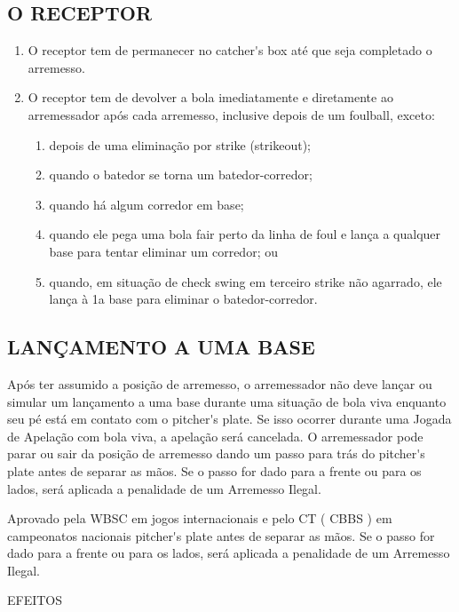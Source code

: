 \subsection{O RECEPTOR}
\begin{enumerate}[label=(\alph*)]\item   O receptor tem de permanecer no \gls{catcher's box} até que seja completado o arremesso.
	\item  O receptor tem de devolver a bola imediatamente e diretamente ao arremessador após cada arremesso, inclusive depois de um \gls{foulball}, exceto:
	\begin{enumerate}[label=\roman*.]
		\item depois de uma eliminação por \gls{strike} (\gls{strikeout});
		\item quando o batedor se torna um batedor-corredor;
		\item quando há algum corredor em base;
		\item quando ele pega uma bola \gls{fair} perto da linha de \gls{foul} e lança a qualquer base para tentar eliminar um corredor; ou
		\item quando, em situação de \gls{check swing} em terceiro \gls{strike} não agarrado, ele lança à 1a base para eliminar o batedor-corredor.
	\end{enumerate}
\end{enumerate}
\subsection{LANÇAMENTO A UMA BASE}
Após ter assumido a posição de arremesso, o arremessador não deve lançar ou simular um lançamento a uma base durante uma situação de bola viva enquanto seu pé está em contato com o \gls{pitcher's plate}. Se isso ocorrer durante uma Jogada de Apelação com bola viva, a apelação será cancelada. O arremessador pode parar ou sair da posição de arremesso dando um passo para trás do  \gls{pitcher's plate} antes de separar as m\~aos. Se o passo for dado para a frente ou para os lados, ser\'a aplicada a penalidade de um Arremesso Ilegal.

Aprovado pela WBSC em jogos internacionais e pelo CT ( CBBS ) em campeonatos nacionais \gls{pitcher's plate} antes de separar as mãos. Se o passo for dado para a frente ou  para os lados, será aplicada a penalidade de um Arremesso Ilegal.

EFEITOS

